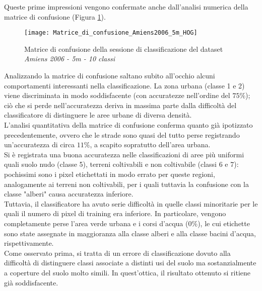 Queste prime impressioni vengono confermate anche dall'analisi numerica della matrice di confusione (Figura
\ref{fig:Matrice_di_confusione_Amiens2006_5m_HOG}).

\begin{figure}[!ht]

\texttt{[image: Matrice\_di\_confusione\_Amiens2006\_5m\_HOG]}

\caption{Matrice di confusione della sessione di classificazione del
dataset \emph{Amiens 2006 - 5m - 10 classi}}

\label{fig:Matrice_di_confusione_Amiens2006_5m_HOG}

\end{figure}

Analizzando la matrice di confusione saltano subito all'occhio alcuni
comportamenti interessanti nella classificazione. La zona urbana
(classe 1 e 2) viene discriminata in modo soddisfacente (con
accuratezze nell'ordine del $75\%$); ciò che si perde nell'accuratezza
deriva in massima parte dalla difficoltà del classificatore di
distinguere le aree urbane di diversa densità.\\

L'analisi quantitativa della matrice di confusione conferma quanto già
ipotizzato precedentemente, ovvero che le strade sono quasi del tutto
perse registrando un'accuratezza di circa $11\%$, a scapito sopratutto
dell'area urbana. \\

Si è registrata una buona accuratezza nelle classificazioni di aree
più uniformi quali suolo nudo (classe 5), terreni coltivabili e non
coltivabile (classi 6 e 7): pochissimi sono i pixel etichettati in
modo errato per queste regioni, analogamente ai terreni non
coltivabili, per i quali tuttavia la confusione con la classe "alberi"
causa accuratezza inferiore.\\

Tuttavia, il classificatore ha avuto serie difficoltà in quelle classi
minoritarie per le quali il numero di pixel di training era inferiore.
In particolare, vengono completamente perse l'area verde urbana e i
corsi d'acqua ($0\%$), le cui etichette sono state assegnate in
maggioranza alla classe alberi e alla classe bacini d'acqua,
rispettivamente.\\

Come osservato prima, si tratta di un errore di classificazione dovuto
alla difficoltà di distinguere classi associate a distinti usi del
suolo ma sostanzialmente a coperture del suolo molto simili. In
quest'ottica, il risultato ottenuto si ritiene già soddisfacente.\\

